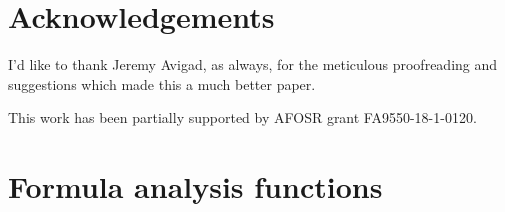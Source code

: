 \documentclass[12pt]{article}
\begin{document}
% 
% 


\section*{Acknowledgements}  \label{sec:ack}

I'd like to thank Jeremy Avigad, as always, for the meticulous proofreading and suggestions 
which made this a much better paper.

This work has been partially supported by AFOSR grant FA9550-18-1-0120.




\appendix

\section{Formula analysis functions} \label{apdx:faf}


\end{document}
